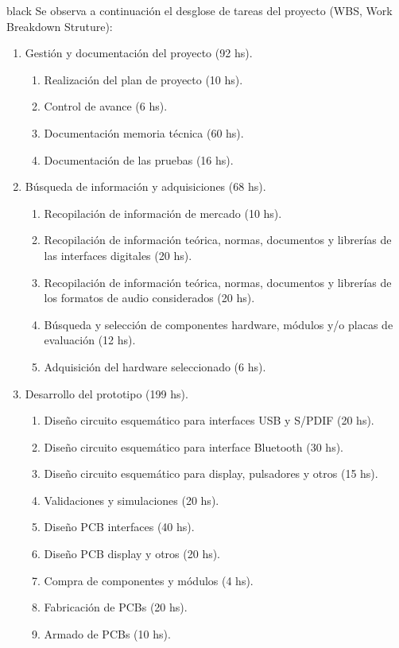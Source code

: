 \documentclass[
11pt, %
codirector, %
]{charter}
\begin{document}
\begin{consigna}{black}
Se observa a continuación el desglose de tareas del proyecto (WBS, Work Breakdown Struture):

\begin{enumerate}
\item Gestión y documentación del proyecto (92 hs).
	\begin{enumerate}
	\item Realización del plan de proyecto (10 hs).
	\item Control de avance (6 hs).
	\item Documentación memoria técnica (60 hs).
	\item Documentación de las pruebas (16 hs).
	\end{enumerate}
\item Búsqueda de información y adquisiciones (68 hs).
	\begin{enumerate}
	\item Recopilación de información de mercado (10 hs).
	\item Recopilación de información teórica, normas, documentos y librerías de las interfaces digitales (20 hs).
	\item Recopilación de información teórica, normas, documentos y librerías de los formatos de audio considerados (20 hs).
	\item Búsqueda y selección de componentes hardware, módulos y/o placas de evaluación (12 hs).
	\item Adquisición del hardware seleccionado (6 hs).
	\end{enumerate}
\item Desarrollo del prototipo (199 hs). 
	\begin{enumerate}
	\item Diseño circuito esquemático para interfaces USB y S/PDIF (20 hs).
	\item Diseño circuito esquemático para interface Bluetooth (30 hs).
	\item Diseño circuito esquemático para display, pulsadores y otros (15 hs).
	\item Validaciones y simulaciones (20 hs). 
	\item Diseño PCB interfaces (40 hs).
	\item Diseño PCB display y otros (20 hs).
	\item Compra de componentes y módulos (4 hs).
	\item Fabricación de PCBs (20 hs).
	\item Armado de PCBs (10 hs).

\end{enumerate}
\end{enumerate}
\end{consigna}
\end{document}
